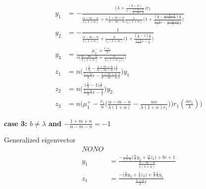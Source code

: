 \documentclass[a4paper,11pt]{article}
\begin{document}
\begin{align*}
 y_1&=-\frac{\Big(\lambda + \frac{(b-\lambda)}{1-\frac{1+m+n}{\alpha-m-n}}\Big)r_1}{\frac{\alpha-m-n}{\lambda(1+\alpha)} + n\frac{1+m+n}{\alpha-m-n}\frac{1}{r_0(1+\alpha)}\Big(1 + \frac{(\frac{1}{\lambda}-\frac{1+m+n}{\alpha-m-n})\frac{\alpha}{s}}{ \frac{1+\alpha}{\lambda}r -\frac{1+m+n}{\alpha-m-n} \frac{1}{s} }\Big) }\\
 y_2&=-\frac{1}{\frac{\alpha-m-n}{\lambda(1+\alpha)} + \frac{n}{r_1(1+\alpha)}\Big(1 + \frac{(\frac{1}{\lambda}-1)\frac{\alpha}{s}}{ \frac{1+\alpha}{\lambda}r - \frac{1}{s} }\Big) }\\
 y_3&=\frac{\mu_1^- +\frac{r_1s_1}{\lambda}}{s\Big(\frac{\alpha-m-n}{\lambda(1+\alpha)} + \frac{n}{\lambda(1+\alpha)r_1}\Big)}\\
 z_1&=n\bigg(\frac{\big(\frac{1}{\lambda}-\frac{1+m+n}{\alpha-m-n}\big)\frac{1}{r}}{ \frac{1+\alpha}{\lambda}r -\frac{1+m+n}{\alpha-m-n} \frac{1}{s} }\bigg)y_1 \\
 z_2&=n\bigg(\frac{\big(\frac{1}{\lambda}-1\big)\frac{1}{r}}{ \frac{1+\alpha}{\lambda}r - \frac{1}{s} }\bigg)y_2 \\
 z_3&=n\bigg(\mu_1^+-\frac{r_1}{n}\Big(\frac{\alpha-m-n}{\lambda(1+\alpha)} - \frac{n\alpha}{\lambda(1+\alpha)r_1}\Big)\bigg)r_1(\frac{\alpha r_1}{\lambda})\bigg)
\end{align*}


{\bf case 3: $b\ne\lambda$ and $-\frac{1+m+n}{\alpha-m-n}= -1$}

Generalized eigenvector
\begin{align*}
NONO\\
 y_1 &= \frac{-\frac{1}{1+\alpha}\Big(\frac{n}{r}y_2 +\frac{\alpha}{s}z_2\Big) + br + 1}{\frac{\alpha-m-n}{\lambda(1+\alpha)}}\\
 z_1 &= \frac{-\Big(\frac{n}{r}y_2 +\frac{1}{s}z_2\Big)+ \frac{n}{r}\frac{1}{\lambda}y_1}{\frac{1+\alpha}{\lambda}r}
\end{align*}
\end{document}

